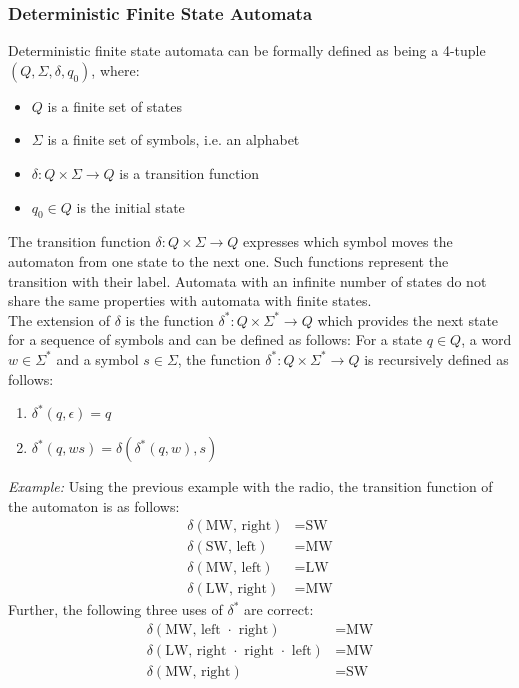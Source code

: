 \subsubsection{Deterministic Finite State Automata}
Deterministic finite state automata can be formally defined as being a 4-tuple $(Q, \Sigma, \delta, q_0)$, where:
\begin{itemize}
  \item $Q$ is a finite set of states
  \item $\Sigma$ is a finite set of symbols, i.e. an alphabet
  \item $\delta : Q \times \Sigma \rightarrow Q$ is a transition function
  \item $q_0 \in Q$ is the initial state
\end{itemize}

The transition function $\delta : Q \times \Sigma \rightarrow Q$ 
expresses which symbol moves the automaton from one state to the next one.
Such functions represent the transition with their label. 
Automata with an infinite number of states do not share the 
same properties with automata with finite states.\\

The extension of $\delta$ is the function $\delta^{*} : Q \times \Sigma^{*} \rightarrow Q$ 
which provides the next state for a sequence of symbols and can be defined as follows:
For a state $q \in Q$, a word $w \in \Sigma^{*}$ and a symbol $s \in \Sigma$,
the function $\delta^{*} : Q \times \Sigma^{*} \rightarrow Q$ is recursively defined as follows:
\begin{enumerate}
  \item $\delta^{*}(q, \epsilon) = q$
  \item $\delta^{*}(q, ws) = \delta(\delta^{*}(q,w),s)$
\end{enumerate}

\textit{Example:} Using the previous example with the radio, the transition function of the automaton is as follows:
\begin{align*}
  \delta(\text{MW, right}) & = \text{SW}\\
  \delta(\text{SW, left}) & = \text{MW}\\
  \delta(\text{MW, left}) & = \text{LW}\\
  \delta(\text{LW, right}) & = \text{MW}
\end{align*}
Further, the following three uses of $\delta^{*}$ are correct:
\begin{align*}
  \delta(\text{MW, left $\cdot$ right}) & = \text{MW}\\
  \delta(\text{LW, right $\cdot$ right $\cdot$ left}) & = \text{MW}\\
  \delta(\text{MW, right}) & = \text{SW}
\end{align*}

